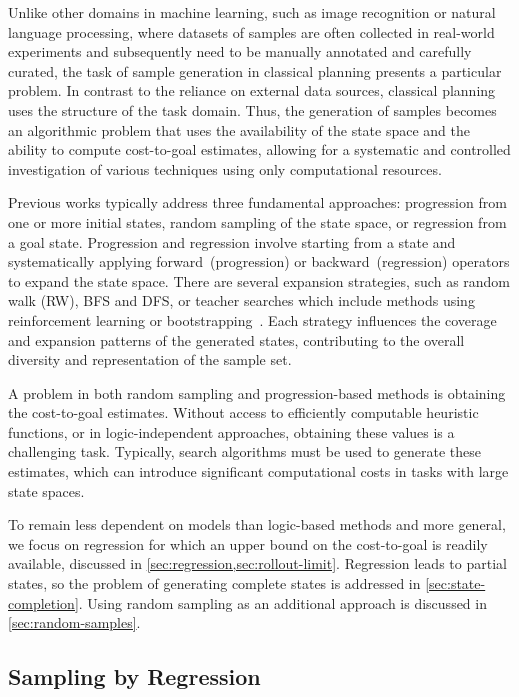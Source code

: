 Unlike other domains in machine learning, such as image recognition or natural language processing, where datasets of samples are often collected in real-world experiments and subsequently need to be manually annotated and carefully curated, the task of sample generation in classical planning presents a particular problem. In contrast to the reliance on external data sources, classical planning uses the structure of the task domain. Thus, the generation of samples becomes an algorithmic problem that uses the availability of the state space and the ability to compute cost-to-goal estimates, allowing for a systematic and controlled investigation of various techniques using only computational resources.

Previous works typically address three fundamental approaches: progression from one or more initial states, random sampling of the state space, or regression from a goal state. Progression and regression involve starting from a state and systematically applying forward~(progression) or backward~(regression) operators to expand the state space. There are several expansion strategies, such as random walk (RW), BFS and DFS, or teacher searches which include methods using reinforcement learning or bootstrapping~\cite{arfaee2011learning}. Each strategy influences the coverage and expansion patterns of the generated states, contributing to the overall diversity and representation of the sample set.

A problem in both random sampling and progression-based methods is obtaining the cost-to-goal estimates. Without access to efficiently computable heuristic functions, or in logic-independent approaches, obtaining these values is a challenging task. Typically, search algorithms must be used to generate these estimates, which can introduce significant computational costs in tasks with large state spaces.

To remain less dependent on models than logic-based methods and more general, we focus on regression for which an upper bound on the cost-to-goal is readily available, discussed in \cref{sec:regression,sec:rollout-limit}. Regression leads to partial states, so the problem of generating complete states is addressed in \cref{sec:state-completion}. Using random sampling as an additional approach is discussed in \cref{sec:random-samples}.

\subsection{Sampling by Regression}
\label{sec:regression}

